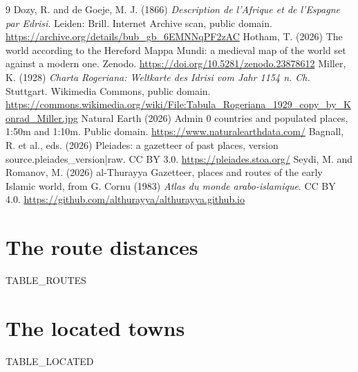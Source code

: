 \documentclass[11pt,a4paper]{article}
\begin{document}
\begin{thebibliography}{9}
 Dozy, R. and de Goeje, M. J. (1866) \textit{Description de l'Afrique et de l'Espagne par Edrisi}. Leiden: Brill. Internet Archive scan, public domain. \url{https://archive.org/details/bub_gb_6EMNNqPF2zAC}
 Hotham, T. (2026) The world according to the Hereford Mappa Mundi: a medieval map of the world set against a modern one. Zenodo. \url{https://doi.org/10.5281/zenodo.23878612}
 Miller, K. (1928) \textit{Charta Rogeriana: Weltkarte des Idrisi vom Jahr 1154 n. Ch.} Stuttgart. Wikimedia Commons, public domain. \url{https://commons.wikimedia.org/wiki/File:Tabula_Rogeriana_1929_copy_by_Konrad_Miller.jpg}
 Natural Earth (2026) Admin 0 countries and populated places, 1:50m and 1:10m. Public domain. \url{https://www.naturalearthdata.com/}
 Bagnall, R. et al., eds. (2026) Pleiades: a gazetteer of past places, version {{source.pleiades_version|raw}}. CC BY 3.0. \url{https://pleiades.stoa.org/}
 Seydi, M. and Romanov, M. (2026) al-Thurayya Gazetteer, places and routes of the early Islamic world, from G. Cornu (1983) \textit{Atlas du monde arabo-islamique}. CC BY 4.0. \url{https://github.com/althurayya/althurayya.github.io}
\end{thebibliography}

\clearpage
\appendix
\section{The route distances}
{{TABLE_ROUTES}}

\section{The located towns}
{{TABLE_LOCATED}}
\end{document}
